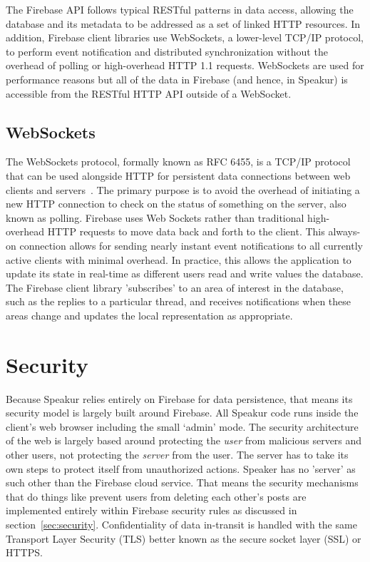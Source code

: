 The Firebase API follows typical RESTful patterns in data access, allowing the database and its metadata to be addressed as a set of linked HTTP resources.
In addition, Firebase client libraries use WebSockets, 
a lower-level TCP/IP protocol, 
to perform event notification and distributed synchronization without the overhead of polling or high-overhead HTTP 1.1 requests.
WebSockets are used for performance reasons but all of the data in Firebase (and hence, in Speakur) is accessible from the RESTful HTTP API outside of a WebSocket.

\subsection{WebSockets}
\label{sec:websockets}
The WebSockets protocol, formally known as RFC 6455, is a TCP/IP protocol that can be used alongside HTTP for persistent data connections between web clients and servers~\cite{mozillacontributors2015-a}.
The primary purpose is to avoid the overhead of initiating a new HTTP connection to check on the status of something on the server, also known as polling.
Firebase uses Web Sockets rather than traditional high-overhead HTTP requests to move data back and forth to the client.
This always-on connection allows for sending nearly instant event notifications to all currently active clients with minimal overhead.
In practice, this allows the application to update its state in real-time as different users read and write values the database.
The Firebase client library 'subscribes' to an area of interest in the database, such as the replies to a particular thread, and receives notifications when these areas change and updates the local representation as appropriate.

\section{Security}
Because Speakur relies entirely on Firebase for data persistence, that means its security model is largely built around Firebase. 
All Speakur code runs inside the client's web browser including the small `admin' mode.
The security architecture of the web is largely based around protecting the \textit{user} from malicious servers and other users, not protecting the \textit{server} from the user.
The server has to take its own steps to protect itself from unauthorized actions.
Speaker has no 'server' as such other than the Firebase cloud service.
That means the security mechanisms that do things like prevent users from deleting each other's posts are implemented entirely within Firebase security rules as discussed in section~\ref{sec:security}.
Confidentiality of data in-transit is handled with the same Transport Layer Security (TLS) better known as the secure socket layer (SSL) or HTTPS.

